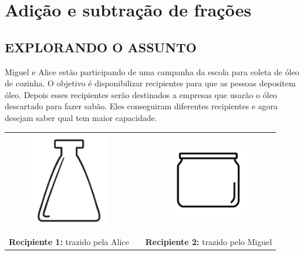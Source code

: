
\setcounter{chapter}{4}
\chapter{Adição e subtração de frações }

\section{EXPLORANDO O ASSUNTO }

\setcounter{subsection}{0}
\begin{atividade}{}


Miguel e Alice estão participando de uma campanha da escola para coleta de óleo de cozinha. O objetivo é disponibilizar recipientes para que as pessoas depositem óleo. Depois esses recipientes serão destinados a empresas que usarão o óleo descartado para fazer sabão. Eles conseguiram diferentes recipientes e agora desejam saber qual tem maior capacidade.

\begin{center}
\begin{tabular}{ccc}
\includegraphics[width=100pt, keepaspectratio]{../figuras/licao05/ativ1_fig01.png} &\quad \quad&\includegraphics[width=100pt, keepaspectratio]{../figuras/licao05/ativ1_fig02.png}\\ \\
{\bf Recipiente 1:} trazido pela Alice & & {\bf Recipiente 2:} trazido pelo Miguel
\end{tabular}
\end{center}


\end{atividade}
